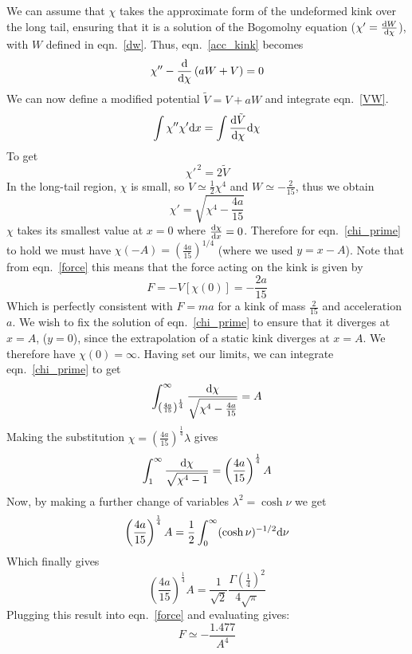 \documentclass[11pt, oneside]{article}  	%
\numberwithin{equation}{section}
\newcommand{\drv}{\ensuremath{\textup{d}}}
\begin{document}
We can assume that $\chi$ takes the approximate form of the undeformed kink over the long tail, ensuring that it is a solution of the Bogomolny equation ($\chi' = \frac{\drv W }{\drv \chi}$), with $W$ defined in eqn.~\ref{dw}. Thus, eqn.~\ref{acc_kink} becomes
\begin{equation}\label{VW}
\chi'' -\frac{\drv}{\drv \chi}\left ( aW + V \right ) =0
\end{equation}
We can now define a modified potential $\tilde{V} = V +aW$ and integrate eqn.~\ref{VW}.
\begin{equation}
\int \chi'' \chi' \drv x = \int \frac{\drv \tilde{V}}{\drv \chi} \drv \chi
\end{equation}
To get
\begin{equation}
\chi'^{\,2} = 2 \tilde{V}
\end{equation}
In the long-tail region, $\chi$ is small, so $V\simeq \frac{1}{2}\chi^4$ and $W\simeq -\frac{2}{15}$, thus we obtain
\begin{equation}\label{chi_prime}
\chi' = \sqrt{\chi^4 - \frac{4a}{15}}
\end{equation}
$\chi$ takes its smallest value at $x=0$ where $\frac{\drv\chi}{\drv x}=0$. Therefore for eqn.~\ref{chi_prime} to hold we must have $\chi(-A) = \left( \frac{4a}{15} \right)^{1/4}$ (where we used $y = x-A$). Note that from eqn.~\ref{force} this means that the force acting on the kink is given by
\begin{equation}
F = -V\left[\chi(0)\right] = -\frac{2a}{15}
\end{equation}
Which is perfectly consistent with $F = ma$ for a kink of mass $\frac{2}{15}$ and acceleration $a$. We wish to fix the solution of eqn.~\ref{chi_prime} to ensure that it diverges at $x = A$, ($y = 0$), since the extrapolation of a static kink diverges at $x=A$. We therefore have $\chi(0) = \infty$. Having set our limits, we can integrate eqn.~\ref{chi_prime} to get
\begin{equation}
\int_{ \left( \frac{4a}{15} \right)^{\frac{1}{4}}}^{\infty}\frac{\drv \chi}{\sqrt{\chi^4 - \frac{4a}{15}}} = A
\end{equation}
Making the substitution $\chi =\left( \frac{4a}{15}\right)^{\frac{1}{4}}\lambda$ gives
\begin{equation}
 \int_{1}^{\infty}\frac{\drv \chi}{\sqrt{\chi^4 - 1}} = \left( \frac{4a}{15}\right)^{\frac{1}{4}} A
\end{equation}
Now, by making a further change of variables $\lambda^2 = \cosh\nu$ we get
\begin{equation}
 \left( \frac{4a}{15}\right)^{\frac{1}{4}} A = \frac{1}{2}\int_{0}^{\infty} (\cosh\nu)^{-1/2}\drv \nu
\end{equation}
Which finally gives
\begin{equation}
 \left( \frac{4a}{15}\right)^{\frac{1}{4}} A =\frac{1}{\sqrt{2}}\frac{\Gamma \left( \frac{1}{4}\right)^2}{4\sqrt{\pi}}
\end{equation}
Plugging this result into eqn.~\ref{force} and evaluating gives:
\begin{equation} \label{prediction}
F \simeq -\frac{1.477}{A^4}
\end{equation}
\end{document}
